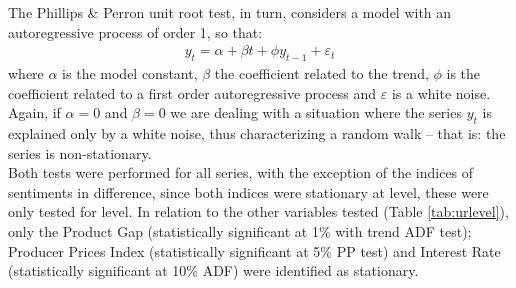 The Phillips \& Perron unit root test, in turn, considers a model with an autoregressive process of order 1, so that:
\begin{align}
    y_t = \alpha + \beta t + \phi y_{t-1} + \varepsilon_t
\end{align}
where $\alpha$ is the model constant, $\beta$ the coefficient related to the trend, $\phi$ is the coefficient related to a first order autoregressive process and $\varepsilon$ is a white noise. Again, if $\alpha=0$ and $\beta = 0$ we are dealing with a situation where the series $y_t$ is explained only by a white noise, thus characterizing a random walk -- that is: the series is non-stationary.\\

Both tests were performed for all series, with the exception of the indices of sentiments in difference, since both indices were stationary at level, these were only tested for level. In relation to the other variables tested (Table {\ref{tab:urlevel}}), only the Product Gap (statistically significant at 1\% with trend ADF test); Producer Prices Index (statistically significant at 5\% PP test) and Interest Rate (statistically significant
at 10\% ADF) were identified as stationary. 

